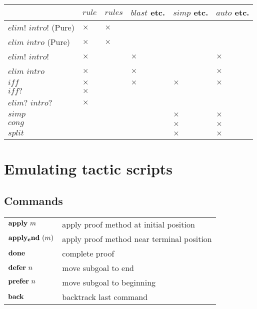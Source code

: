 \begin{tabular}{l|lllll}
                          & $rule$   & $rules$  & $blast$ etc. & $simp$ etc. & $auto$ etc. \\
  \hline
  $elim!$ $intro!$ (Pure) & $\times$ & $\times$ \\
  $elim$ $intro$ (Pure)   & $\times$ & $\times$ \\
  $elim!$ $intro!$        & $\times$ &          & $\times$     &             & $\times$ \\
  $elim$ $intro$          & $\times$ &          & $\times$     &             & $\times$ \\
  $iff$                   & $\times$ &          & $\times$     & $\times$    & $\times$ \\
  $iff?$                  & $\times$ \\
  $elim?$ $intro?$        & $\times$ \\
  $simp$                  &          &          &              & $\times$    & $\times$ \\
  $cong$                  &          &          &              & $\times$    & $\times$ \\
  $split$                 &          &          &              & $\times$    & $\times$ \\
\end{tabular}


\section{Emulating tactic scripts}

\subsection{Commands}

\begin{tabular}{ll}
  $\APPLY{m}$ & apply proof method at initial position \\
  ${\mathord{\mathbf{apply_end}}}~(m)$ & apply proof method near terminal position \\
  ${\mathord{\mathbf{done}}}$ & complete proof \\
  ${\mathord{\mathbf{defer}}}~n$ & move subgoal to end \\
  ${\mathord{\mathbf{prefer}}}~n$ & move subgoal to beginning \\
  ${\mathord{\mathbf{back}}}$ & backtrack last command \\
\end{tabular}

